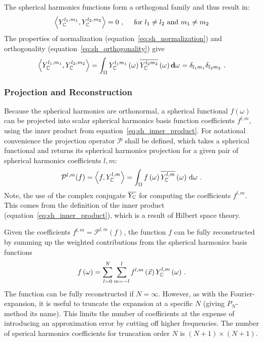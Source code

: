 The spherical harmonics functions form a orthogonal family and thus result in:
\begin{align}
\left<Y_{\mathbb{C}}^{l_1, m_1},Y_{\mathbb{C}}^{l_2, m_2}\right>
=
0
\ ,\quad\text{ for } l_1 \ne l_2 \text{ and } m_1 \ne m_2
\end{align}
The properties of normalization (equation~\ref{eq:sh_normalization}) and orthogonality (equation~\ref{eq:sh_orthogonality}) give
\begin{align}
\label{eq:sh_orthogonality}
\left<Y_{\mathbb{C}}^{l_1, m_1},Y_{\mathbb{C}}^{l_2, m_2}\right>=
\int_{\Omega} Y_{\mathbb{C}}^{l_1m_1}\left(\omega\right) \overline{Y_{\mathbb{C}}^{l_2m_2}}\left(\omega\right) \mathbf{d}\omega = \delta_{l_1m_1}\delta_{l_2m_2}
\ .
\end{align}

\subsubsection*{Projection and Reconstruction}

Because the spherical harmonics are orthonormal, a spherical functional $f\left(\omega\right)$ can be projected into scalar spherical harmonics basis function coefficients $f^{l,m}$, using the inner product from equation~\ref{eq:sh_inner_product}. For notational convenience the projection operator $\mathcal{P}$ shall be defined, which takes a spherical functional and returns its spherical harmonics projection for a given pair of spherical harmonics coefficients $l,m$:
\begin{align}
\label{eq:sh_projection}
\mathcal{P}^{l, m}(f) =  \left<f,Y_{\mathbb{C}}^{l, m}\right> = 
\int_\Omega f\left(\omega\right)\overline{Y_{\mathbb{C}}^{l,m}}\left(\omega\right)\,\mathrm{d}\omega
\ .
\end{align}
Note, the use of the complex conjugate $\overline{Y_{\mathbb{C}}}$ for computing the coefficients $f^{l,m}$. This comes from the definition of the inner product (equation~\ref{eq:sh_inner_product}), which is a result of Hilbert space theory. 

Given the coefficients $f^{l, m} = \mathcal{P}^{l, m}(f)$, the function $f$ can be fully reconstructed by summing up the weighted contributions from the spherical harmonics basis functions
\begin{align}
\label{eq:sh_reconstruction}
f\left(\omega\right) = 
\sum_{l=0}^{N}
{
\sum_{m=-l}^{l}
{
f^{l,m}\left(\vec{x}\right)Y_{\mathbb{C}}^{l,m}\left(\omega\right)
}
}
\ .
\end{align}
The function can be fully reconstructed if $N=\infty$. However, as with the Fourier-expansion, it is useful to truncate the expansion at a specific $N$ (giving $P_N$-method its name). This limits the number of coefficients at the expense of introducing an approximation error by cutting off higher frequencies. The number of sperical harmonics coefficients for truncation order $N$ is $(N+1)\times(N+1)$.

